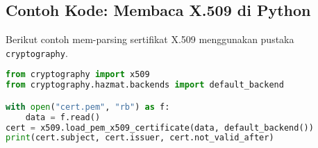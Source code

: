 \documentclass[../main.tex]{subfiles}
\begin{document}
\subsection{Contoh Kode: Membaca X.509 di Python}
Berikut contoh mem-parsing sertifikat X.509 menggunakan pustaka \texttt{cryptography}.

\begin{lstlisting}[language=Python, caption={Parse X.509}, label={lst:x509}]
from cryptography import x509
from cryptography.hazmat.backends import default_backend

with open("cert.pem", "rb") as f:
    data = f.read()
cert = x509.load_pem_x509_certificate(data, default_backend())
print(cert.subject, cert.issuer, cert.not_valid_after)
\end{lstlisting}
\end{document}
